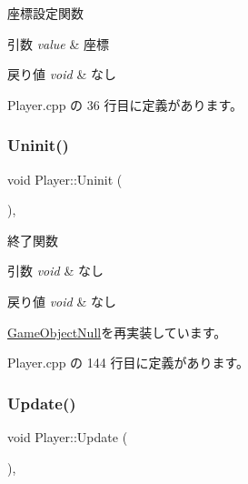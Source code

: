 座標設定関数 


\begin{DoxyParams}{引数}
{\em value} & 座標 \\
\hline
\end{DoxyParams}

\begin{DoxyRetVals}{戻り値}
{\em void} & なし \\
\hline
\end{DoxyRetVals}


 Player.\+cpp の 36 行目に定義があります。

\mbox{\label{class_player_a7455a83ac23d2f5e0cce0ddd7d92db0c}} 
\subsubsection{\texorpdfstring{Uninit()}{Uninit()}}
{\footnotesize\ttfamily void Player\+::\+Uninit (\begin{DoxyParamCaption}{ }\end{DoxyParamCaption})\hspace{0.3cm}{\ttfamily [override]}, {\ttfamily [virtual]}}



終了関数 


\begin{DoxyParams}{引数}
{\em void} & なし \\
\hline
\end{DoxyParams}

\begin{DoxyRetVals}{戻り値}
{\em void} & なし \\
\hline
\end{DoxyRetVals}


\mbox{\hyperlink{class_game_object_null_a1a70fbd3260fd1c0100320756830a0db}{Game\+Object\+Null}}を再実装しています。



 Player.\+cpp の 144 行目に定義があります。

\mbox{\label{class_player_a5e17be3418fa0ac0192c05efaf3dc8bd}} 
\subsubsection{\texorpdfstring{Update()}{Update()}}
{\footnotesize\ttfamily void Player\+::\+Update (\begin{DoxyParamCaption}{ }\end{DoxyParamCaption})\hspace{0.3cm}{\ttfamily [override]}, {\ttfamily [virtual]}}



